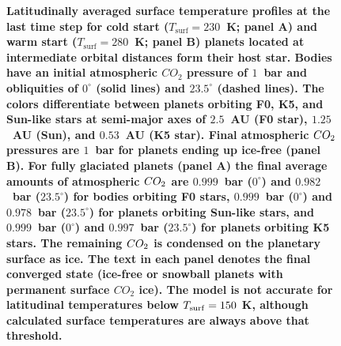 \documentclass[fleqn,usenatbib]{mnras}
\providecommand{\DIFadd}[1]{{\bf #1}} %
\providecommand{\DIFaddFL}[1]{\DIFadd{#1}} %
\begin{document}
\begin{figure}
    \caption{\DIFaddFL{Latitudinally averaged surface temperature profiles at the last time step for cold start ($T_{\mathrm{surf}}=230$~K; panel A) and warm start ($T_{\mathrm{surf}}=280$~K; panel B) planets located at intermediate orbital distances form their host star. Bodies have an initial atmospheric $CO_{\mathrm{2}}$ pressure of $1$~bar and obliquities of $0^{\circ}$ (solid lines) and $23.5^{\circ}$ (dashed lines). The colors differentiate between planets orbiting F0, K5, and Sun-like stars at semi-major axes of $2.5$~AU (F0 star), $1.25$~AU (Sun), and $0.53$~AU (K5 star). Final atmospheric $CO_{\rm 2}$ pressures are $1$~bar for planets ending up ice-free (panel B). For fully glaciated planets (panel A) the final average amounts of atmospheric $CO_{\rm 2}$ are $0.999$~bar ($0^{\circ}$) and $0.982$~bar ($23.5^{\circ}$) for bodies orbiting F0 stars, $0.999$~bar ($0^{\circ}$) and $0.978$~bar ($23.5^{\circ}$) for planets orbiting Sun-like stars, and $0.999$~bar ($0^{\circ}$) and $0.997$~bar ($23.5^{\circ}$) for planets orbiting K5 stars. The remaining $CO_{\rm 2}$ is condensed on the planetary surface as ice. The text in each panel denotes the final converged state  (ice-free or snowball planets with permanent surface $CO_{\mathrm 2}$ ice).  The model is not accurate for latitudinal temperatures below $T_{\rm surf}=150$ K, although calculated surface temperatures are always above that threshold.
    }}
    \label{fig:comp_a0}
\end{figure}
\end{document}

